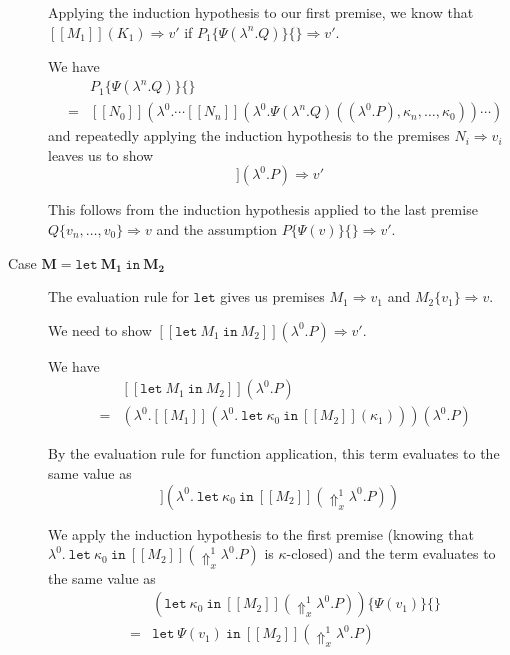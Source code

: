 \documentclass[a4paper,11pt,draft]{article}
\newcommand{\kw}[1]{\mathtt{#1}}
\begin{document}
\begin{description}
Applying the induction hypothesis to our first premise, we know that $[\![M_{1}]\!](K_{1}) \Rightarrow v'$ if $P_{1}\{\Psi(\lambda^{n}.Q)\}\{\} \Rightarrow v'$.

We have
\begin{eqnarray*}
&   & P_{1}\{\Psi(\lambda^{n}.Q)\}\{\} \\
& = & [\![N_{0}]\!](\lambda^{0}. \cdots [\![N_{n}]\!](\lambda^{0}.\Psi(\lambda^{n}.Q)((\lambda^{0}.P), \kappa_{n}, \ldots, \kappa_{0})) \cdots )
\end{eqnarray*}
and repeatedly applying the induction hypothesis to the premises $N_{i} \Rightarrow v_{i}$ leaves us to show
\begin{displaymath}
[\![Q\{v_{n}, \ldots, v_{0}\}]\!] (\lambda^{0}.P) \Rightarrow v'
\end{displaymath}

This follows from the induction hypothesis applied to the last premise
$Q\{v_{n}, \ldots, v_{0}\} \Rightarrow v$ and the assumption $P\{\Psi(v)\}\{\}
\Rightarrow v'$.

\item[\sffamily Case $\boldsymbol{M = \kw{let} \: M_{1} \: \kw{in} \: M_{2}}$]\hfill

The evaluation rule for $\kw{let}$ gives us premises $M_{1} \Rightarrow v_{1}$ and $M_{2}\{v_{1}\} \Rightarrow v$.

We need to show
$[\![\kw{let} \: M_{1} \: \kw{in} \: M_{2}]\!](\lambda^{0}.P) \Rightarrow v'$.

We have
\begin{eqnarray*}
 &   & [\![\kw{let} \: M_{1} \: \kw{in} \: M_{2}]\!](\lambda^{0}.P) \\
 & = & (\lambda^{0}.[\![M_{1}]\!](\lambda^{0}. \: \kw{let} \: \kappa_{0} \: \kw{in} \: [\![M_{2}]\!](\kappa_{1})))(\lambda^{0}.P)
\end{eqnarray*}

By the evaluation rule for function application, this term evaluates to the same value as
\begin{displaymath}
[\![M_{1}]\!](\lambda^{0}. \: \kw{let} \: \kappa_{0} \: \kw{in} \: [\![M_{2}]\!](\Uparrow_{x}^{1} \lambda^{0}.P))
\end{displaymath}

We apply the induction hypothesis to the first premise (knowing that $\lambda^{0}. \: \kw{let} \: \kappa_{0} \: \kw{in} \: [\![M_{2}]\!](\Uparrow_{x}^{1} \lambda^{0}.P)$
is $\kappa$-closed) and the term evaluates to the same value as
\begin{eqnarray*}
 &   & (\kw{let} \: \kappa_{0} \: \kw{in} \: [\![M_{2}]\!](\Uparrow_{x}^{1} \lambda^{0}.P))\{\Psi(v_{1})\}\{\} \\
 & = & \kw{let} \: \Psi(v_{1}) \: \kw{in} \: [\![M_{2}]\!](\Uparrow_{x}^{1} \lambda^{0}.P)
\end{eqnarray*}


\end{description}
\end{document}

